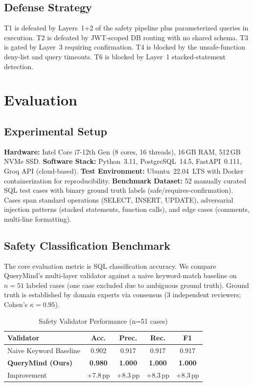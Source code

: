 \documentclass[conference]{IEEEtran}
\begin{document}
\subsection{Defense Strategy}
T1 is defeated by Layers~1+2 of the safety pipeline plus parameterized queries in execution. T2 is defeated by JWT-scoped DB routing with no shared schema. T3 is gated by Layer~3 requiring confirmation. T4 is blocked by the unsafe-function deny-list and query timeouts. T6 is blocked by Layer~1 stacked-statement detection.

\section{Evaluation}

\subsection{Experimental Setup}
\textbf{Hardware:} Intel Core i7-12th Gen (8 cores, 16 threads), 16\,GB RAM, 512\,GB NVMe SSD.
\textbf{Software Stack:} Python~3.11, PostgreSQL~14.5, FastAPI~0.111, Groq API (cloud-based).
\textbf{Test Environment:} Ubuntu~22.04~LTS with Docker containerization for reproducibility.
\textbf{Benchmark Dataset:} 52 manually curated SQL test cases with binary ground truth labels (safe/requires-confirmation). Cases span standard operations (SELECT, INSERT, UPDATE), adversarial injection patterns (stacked statements, function calls), and edge cases (comments, multi-line formatting).

\subsection{Safety Classification Benchmark}

The core evaluation metric is SQL classification accuracy. We compare QueryMind's multi-layer validator against a naive keyword-match baseline on $n=51$ labeled cases (one case excluded due to ambiguous ground truth). Ground truth is established by domain experts via consensus (3 independent reviewers; Cohen's $\kappa = 0.95$).

\begin{table}[h]
\caption{Safety Validator Performance (n=51 cases)}
\label{tab:validator}
\centering
\begin{tabular}{lcccc}
\toprule
\textbf{Validator} & \textbf{Acc.} & \textbf{Prec.} & \textbf{Rec.} & \textbf{F1} \\
\midrule
Naive Keyword Baseline & 0.902 & 0.917 & 0.917 & 0.917 \\
\textbf{QueryMind (Ours)} & \textbf{0.980} & \textbf{1.000} & \textbf{1.000} & \textbf{1.000} \\
\midrule
Improvement & +7.8\,pp & +8.3\,pp & +8.3\,pp & +8.3\,pp \\
\bottomrule
\end{tabular}
\end{table}
\end{document}
